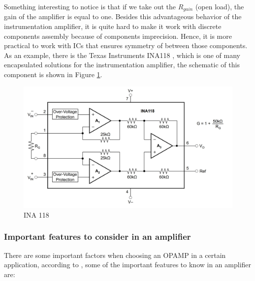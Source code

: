 	Something interesting to notice is that if we take out the $R_{gain}$ (open load), the gain of the amplifier is equal to one. Besides this advantageous behavior of the instrumentation amplifier, it is quite hard to make it work with discrete components assembly because of components imprecision. Hence, it is more practical to work with ICs that ensures symmetry of between those components. As an example, there is the Texas Instruments INA118 \cite{ina118}, which is one of many encapsulated solutions for the instrumentation amplifier, the schematic of this component is shown in Figure \ref{fig:ina118}.

	\begin{figure}[htbp]
		\centering
			\includegraphics[width=.8\textwidth]{figuras/fig-ina118}
		\caption{INA 118 \cite{schematic-ina118}}
		\label{fig:ina118}
	\end{figure}

	\subsubsection{Important features to consider in an amplifier}\label{sssec:important-features-to-consider-in-a-amplifier}

		There are some important factors when choosing an OPAMP in a certain application, according to \cite{analog2011operational}, some of the important features to know in an amplifier are:

